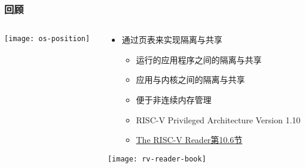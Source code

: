 \begin{frame}   
	\frametitle{回顾}
	
	\begin{columns}
		
		\begin{column}{.5\textwidth}
			
			\texttt{[image: os-position]}
			
		\end{column}
		
		
		\begin{column}{.5\textwidth}
			
			\begin{itemize}\large
				\item 通过页表来实现隔离与共享
				\begin{itemize}
					\item 运行的应用程序之间的隔离与共享
					\item 应用与内核之间的隔离与共享
					\item 便于非连续内存管理						
					\item RISC-V Privileged Architecture Version 1.10
					\item \href{http://crva.ict.ac.cn/documents/RISC-V-Reader-Chinese-v2p1.pdf}{The RISC-V Reader第10.6节}	
				\end{itemize}
			\end{itemize}
			\centering
			\texttt{[image: rv-reader-book]}
		\end{column}
		
		
	\end{columns}
	
\end{frame}


